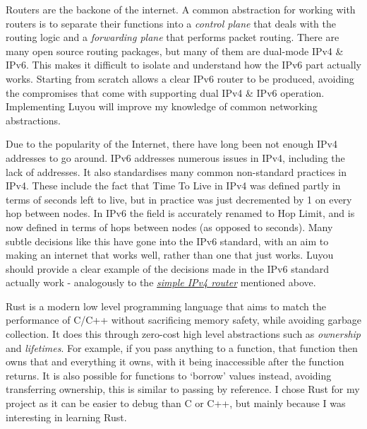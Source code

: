 \documentclass[12pt,a4paper,twoside,openright]{report}
\begin{document}
\bigskip

Routers are the backone of the internet. A common abstraction for working with routers is to separate their functions into a \textit{control plane} that deals with the routing logic and a \textit{forwarding plane} that performs packet routing. There are many open source routing packages\cite{open_source_routing}, but many of them are dual-mode IPv4 \& IPv6. This makes it difficult to isolate and understand how the IPv6 part actually works.  Starting from scratch allows a clear IPv6 router to be produced, avoiding the compromises that come with supporting dual IPv4 \& IPv6 operation.  Implementing Luyou will improve my knowledge of common networking abstractions.

\bigskip

Due to the popularity of the Internet, there have long been not enough IPv4\cite{ipv4_rfc} addresses to go around. IPv6 addresses numerous issues in IPv4, including the lack of addresses. It also standardises many common non-standard practices in IPv4. These include the fact that Time To Live in IPv4 was defined partly in terms of seconds left to live, but in practice was just decremented by 1 on every hop between nodes. In IPv6 the field is accurately renamed to Hop Limit, and is now defined in terms of hops between nodes (as opposed to seconds). Many subtle decisions like this have gone into the IPv6 standard, with an aim to making an internet that works well, rather than one that just works. Luyou should provide a clear example of the decisions made in the IPv6 standard actually work - analogously to the \hyperref[lab::simple_router]{\textit{simple IPv4 router}}\cite{simple_router} mentioned above.

\bigskip

Rust\cite{rust} is a modern low level programming language that aims to match the performance of C/C++ without sacrificing memory safety, while avoiding garbage collection. It does this through zero-cost high level abstractions such as \textit{ownership} and \textit{lifetimes}. For example, if you pass anything to a function, that function then owns that and everything it owns, with it being inaccessible after the function returns. It is also possible for functions to `borrow' values instead, avoiding transferring ownership, this is similar to passing by reference.  I chose Rust for my project as it can be easier to debug than C or C++, but mainly because I was interesting in learning Rust.

\bigskip
\end{document}
